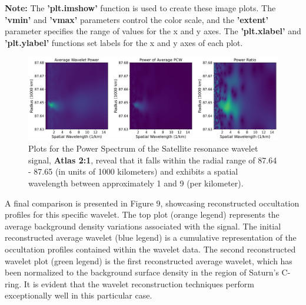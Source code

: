 \documentclass{article}
\begin{document}
\textbf{Note:}
The \textbf{'plt.imshow'} function is used to create these image plots. The \textbf{'vmin'} and \textbf{'vmax'} parameters control the color scale, and the \textbf{'extent'} parameter specifies the range of values for the x and y axes. The \textbf{'plt.xlabel'} and \textbf{'plt.ylabel'} functions set labels for the x and y axes of each plot.

\begin{figure}[h]
\centering 
\includegraphics[width=1.0\textwidth]{power_ratio_plotw87.png} 
\caption{Plots for the Power Spectrum of the Satellite resonance wavelet signal, \textbf{Atlas 2:1}, reveal that it falls within the radial range of 87.64 - 87.65 (in units of 1000 kilometers) and exhibits a spatial wavelength between approximately 1 and 9 (per kilometer).} \label{fig:my_label}
\end{figure}


A final comparison is presented in Figure 9, showcasing reconstructed occultation profiles for this specific wavelet. The top plot (orange legend) represents the average background density variations associated with the signal. The initial reconstructed average wavelet (blue legend) is a cumulative representation of the occultation profiles contained within the wavelet data. The second reconstructed wavelet plot (green legend) is the first reconstructed average wavelet, which has been normalized to the background surface density in the region of Saturn's C-ring. It is evident that the wavelet reconstruction techniques perform exceptionally well in this particular case.
\end{document}
